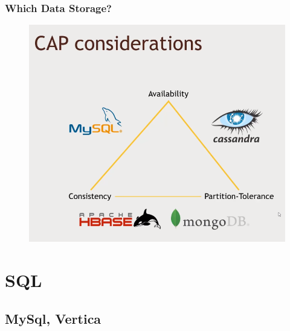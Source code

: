 \documentclass{beamer}
\begin{document}
\begin{frame}
\frametitle{Which Data Storage?}
\begin{figure}
	\includegraphics[scale=0.4]{CAP}
\end{figure}
\end{frame}


\section{SQL}
\subsection{MySql, Vertica}



\end{document}
